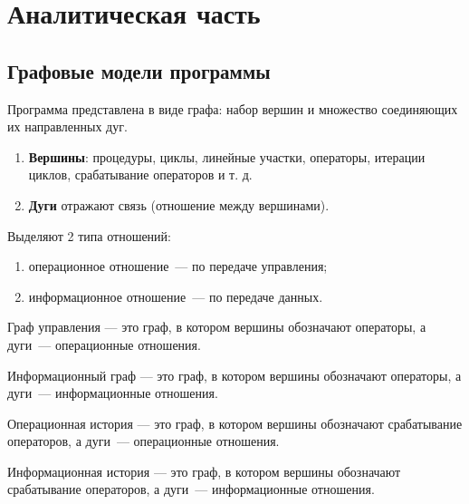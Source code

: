 \chapter{Аналитическая часть}

\section{Графовые модели программы}

Программа представлена в виде графа: набор вершин и множество соединяющих их направленных дуг.

\begin{enumerate}
    \item \textbf{Вершины}: процедуры, циклы, линейные участки, операторы, итерации циклов, срабатывание операторов и т. д.
    \item \textbf{Дуги} отражают связь (отношение между вершинами).
\end{enumerate}

Выделяют 2 типа отношений:
\begin{enumerate}
    \item операционное отношение~--- по передаче управления;
    \item информационное отношение~--- по передаче данных.
\end{enumerate}

Граф управления --- это граф, в котором вершины обозначают операторы, а дуги~--- операционные отношения.

Информационный граф --- это граф, в котором вершины обозначают операторы, а дуги~--- информационные отношения.

Операционная история --- это граф, в котором вершины обозначают срабатывание операторов, а дуги~--- операционные отношения.

Информационная история --- это граф, в котором вершины обозначают срабатывание операторов, а дуги~--- информационные отношения.
